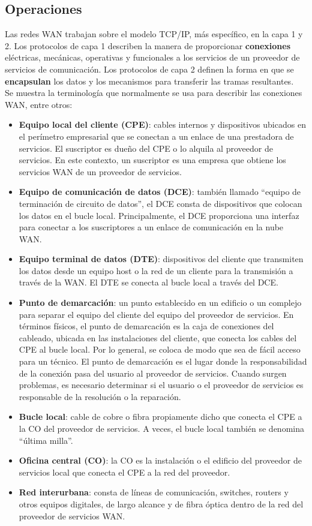 \documentclass[
	12pt, %
	fleqn, %
	a4paper, %
	oneside, %
]{LegrandOrangeBook}
\begin{document}
\subsection{Operaciones}
Las redes WAN trabajan sobre el modelo TCP/IP, más específico, en la capa 1 y 2. Los protocolos de capa 1 describen la manera de  proporcionar \textbf{conexiones} eléctricas, mecánicas, operativas  y funcionales a los servicios de un proveedor de servicios  de comunicación. Los protocolos de capa 2 definen la forma en que se  \textbf{encapsulan} los datos y los mecanismos para transferir las  tramas resultantes.\\
Se muestra la terminología que normalmente se usa para describir las conexiones WAN, entre otros:
\begin{itemize}
\item \textbf{Equipo local del cliente (CPE)}: cables internos y dispositivos ubicados en el perímetro empresarial que se conectan a un enlace de una prestadora de servicios. El suscriptor es dueño del CPE o lo alquila al proveedor de servicios. En este contexto, un suscriptor es una empresa que obtiene los servicios WAN de un proveedor de servicios.
\item \textbf{Equipo de comunicación de datos (DCE)}: también llamado “equipo de terminación de circuito de datos”, el DCE consta de dispositivos que colocan los datos en el bucle local. Principalmente, el DCE proporciona una interfaz para conectar a los suscriptores a un enlace de comunicación en la nube WAN.
\item \textbf{Equipo terminal de datos (DTE)}: dispositivos del cliente que transmiten los datos desde un equipo host o la red de un cliente para la transmisión a través de la WAN. El DTE se conecta al bucle local a través del DCE.
\item \textbf{Punto de demarcación}: un punto establecido en un edificio o un complejo para separar el equipo del cliente del equipo del proveedor de servicios. En términos físicos, el punto de demarcación es la caja de conexiones del cableado, ubicada en las instalaciones del cliente, que conecta los cables del CPE al bucle local. Por lo general, se coloca de modo que sea de fácil acceso para un técnico. El punto de demarcación es el lugar donde la responsabilidad de la conexión pasa del usuario al proveedor de servicios. Cuando surgen problemas, es necesario determinar si el usuario o el proveedor de servicios es responsable de la resolución o la reparación.
\item \textbf{Bucle local}: cable de cobre o fibra propiamente dicho que conecta el CPE a la CO del proveedor de servicios. A veces, el bucle local también se denomina “última milla”.
\item \textbf{Oficina central (CO)}: la CO es la instalación o el edificio del proveedor de servicios local que conecta el CPE a la red del proveedor.
\item \textbf{Red interurbana}: consta de líneas de comunicación, switches, routers y otros equipos digitales, de largo alcance y de fibra óptica dentro de la red del proveedor de servicios WAN.
\end{itemize}
\end{document}
